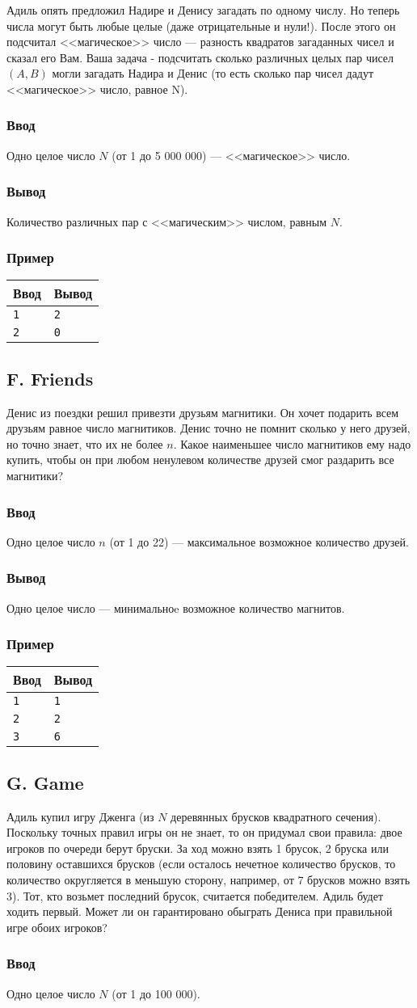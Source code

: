 \documentclass[10pt, a4paper]{article}
\newcommand{\informat}[1]
{
	\subsubsection*{Ввод} #1
}
\newcommand{\outformat}[1]
{
	\subsubsection*{Вывод} #1
}
\newcommand{\examplee}[4]
{
	\subsubsection*{Пример}
	\noindent
	\begin{center}
	\begin{tabularx}{\linewidth}{|X|X|}
	\hline
	Ввод 	& Вывод  	\\
	\hline
	{\tt #1} & {\tt #2}	\\
	\hline
	{\tt #3} & {\tt #4}	\\
	\hline
	\end{tabularx}
	\end{center}
}
\newcommand{\exampleee}[6]
{
	\subsubsection*{Пример}
	\noindent
	\begin{center}
	\begin{tabularx}{\linewidth}{|X|X|}
	\hline
	Ввод 	& Вывод  	\\
	\hline
	{\tt #1} & {\tt #2}	\\
	\hline
	{\tt #3} & {\tt #4}	\\
	\hline
	{\tt #5} & {\tt #6}	\\
	\hline
	\end{tabularx}
	\end{center}
}
\begin{document}
Адиль опять предложил Надире и Денису загадать по одному числу. Но теперь числа могут быть любые целые (даже отрицательные и нули!). После этого он подсчитал <<магическое>> число --- разность квадратов загаданных чисел и сказал его Вам. Ваша задача - подсчитать сколько различных целых пар чисел $(A, B)$ могли загадать Надира и Денис (то есть сколько пар чисел дадут <<магическое>> число, равное N).

\informat{Одно целое число $N$ (от 1 до 5 000 000) --- <<магическое>> число.}

\outformat{Количество различных пар с <<магическим>> числом, равным $N$.}

\examplee{1}{2}{2}{0}



\subsection*{F. Friends}

Денис из поездки решил привезти друзьям магнитики. Он хочет подарить всем друзьям равное число магнитиков. Денис точно не помнит сколько у него друзей, но точно знает, что их не более $n$. Какое наименьшее число магнитиков ему надо купить, чтобы он при любом ненулевом количестве друзей смог раздарить все магнитики?

\informat{Одно целое число $n$ (от 1 до 22) --- максимальное возможное количество друзей.}

\outformat{Одно целое число --- минимальноe возможное количество магнитов.}

\exampleee{1}{1}{2}{2}{3}{6}



\subsection*{G. Game}

Адиль купил игру Дженга (из $N$ деревянных брусков квадратного сечения). Поскольку точных правил игры он не знает, то он придумал свои правила: двое игроков по очереди берут бруски. За ход можно взять 1 брусок, 2 бруска или половину оставшихся брусков (если осталось нечетное количество брусков, то количество округляется в меньшую сторону, например, от 7 брусков можно взять 3). Тот, кто возьмет последний брусок, считается победителем. Адиль будет ходить первый. Может ли он гарантировано обыграть Дениса при правильной игре обоих игроков?

\informat{Одно целое число $N$ (от 1 до 100 000).}
\end{document}
